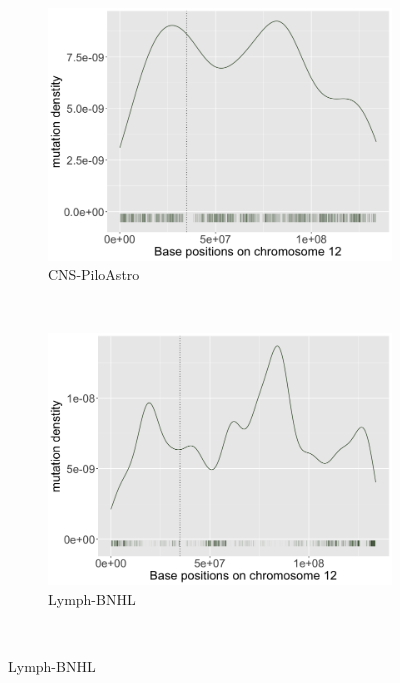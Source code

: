 \begin{figure}[h!]
    \begin{subfigure}{.5\textwidth}
    \includegraphics[width=\linewidth,height=0.7\textwidth]{graphics/mutdistribution_CNS-PiloAstro.png}
    \caption{CNS-PiloAstro}
    \end{subfigure}
    ~
    \begin{subfigure}{.5\textwidth}
    \includegraphics[width=\linewidth,height=0.7\textwidth]{graphics/mutdistribution_Lymph-BNHL.png}
    \caption{Lymph-BNHL}
    \end{subfigure} \\
    

\end{figure}
